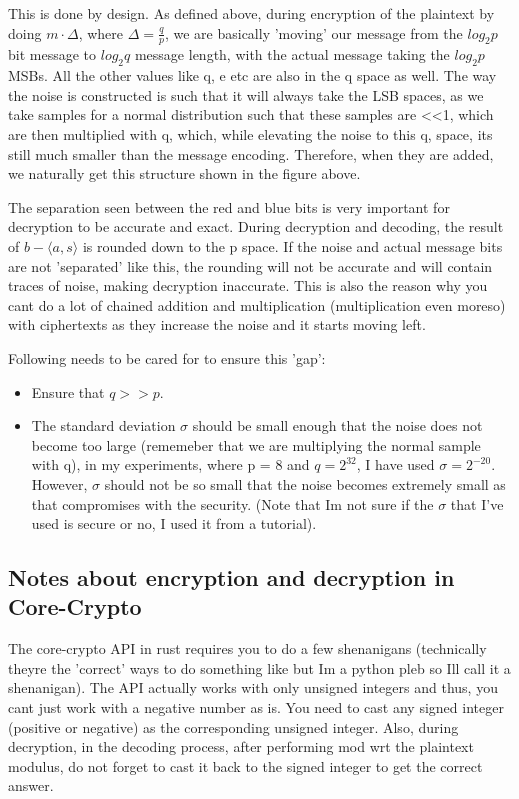 \documentclass{report}
\begin{document}
This is done by design. As defined above, during encryption of the plaintext by doing $m \cdot \Delta$, where $\Delta = \frac {q} {p}$, we are basically 'moving' our message from the $log_2p$ bit message to $log_2q$ message length, with the actual message taking the $log_2p$ MSBs. All the other values like q, e etc are also in the q space as well. The way the noise is constructed is such that it will always take the LSB spaces, as we take samples for a normal distribution such that these samples are <<1, which are then multiplied with q, which, while elevating the noise to this q, space, its still much smaller than the message encoding. Therefore, when they are added, we naturally get this structure shown in the figure above. \newline

The separation seen between the red and blue bits is very important for decryption to be accurate and exact. During decryption and decoding, the result of $b - \langle a, s \rangle$ is rounded down to the p space.  If the noise and actual message bits are not 'separated' like this, the rounding will not be accurate and will contain traces of noise, making decryption inaccurate. This is also the reason why you cant do a lot of chained addition and multiplication (multiplication even moreso) with ciphertexts as they increase the noise and it starts moving left. \newline

Following needs to be cared for to ensure this 'gap':
\begin{itemize}
	\item Ensure that $q >> p$.
	\item The standard deviation $\sigma$ should be small enough that the noise does not become too large (rememeber that we are multiplying the normal sample with q), in my experiments, where p = 8 and $q = 2^{32}$, I have used $\sigma = 2^{-20}$. However, $\sigma$ should not be so small that the noise becomes extremely small as that compromises with the security. (Note that Im not sure if the $\sigma$ that I've used is secure or no, I used it from a tutorial).
\end{itemize}

\subsection{Notes about encryption and decryption in Core-Crypto}
The core-crypto API in rust requires you to do a few shenanigans (technically theyre the 'correct' ways to do something like but Im a python pleb so Ill call it a shenanigan). The API actually works with only unsigned integers and thus, you cant just work with a negative number as is. You need to cast any signed integer (positive or negative) as the corresponding unsigned integer. Also, during decryption, in the decoding process, after performing mod wrt the plaintext modulus, do not forget to cast it back to the signed integer to get the correct answer.
\end{document}
